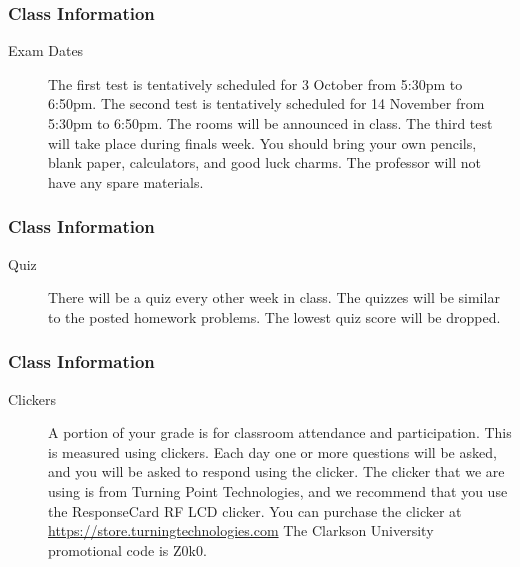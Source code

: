 \begin{frame}
  \frametitle{Class Information}

\begin{description}
\item[Exam Dates] The first test is tentatively scheduled for 3
  October from 5:30pm to 6:50pm. The second test is tentatively
  scheduled for 14 November from 5:30pm to 6:50pm. The rooms will be
  announced in class. The third test will take place during finals
  week.  You should bring your own pencils, blank paper, calculators,
  and good luck charms.  The professor will not have any spare
  materials.
 
\end{description}

\end{frame}

\begin{frame}
  \frametitle{Class Information}

\begin{description}
\item[Quiz] There will be a quiz every other week in class. The
  quizzes will be similar to the posted homework problems. The lowest
  quiz score will be dropped.
\end{description}

\end{frame}


\begin{frame}
  \frametitle{Class Information}

\begin{description}
  \item[Clickers] A portion of your grade is for classroom attendance
    and participation. This is measured using clickers. Each day one
    or more questions will be asked, and you will be asked to respond
    using the clicker. The clicker that we are using is from Turning
    Point Technologies, and we recommend that you use the ResponseCard
    RF LCD clicker. You can purchase the clicker at
    \url{https://store.turningtechnologies.com} The Clarkson
    University promotional code is Z0k0.

\end{description}

\end{frame}

